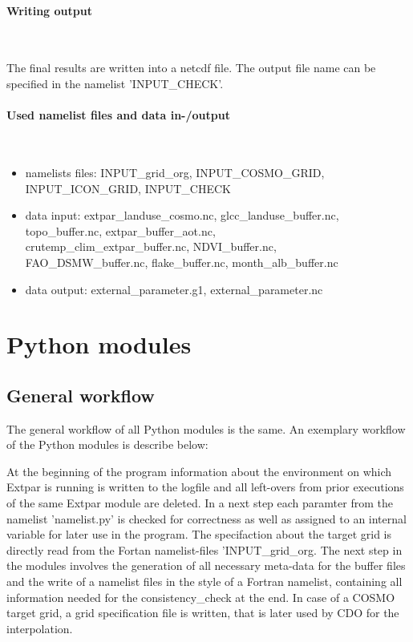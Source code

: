 \documentclass[a4paper,10pt,DIV14,BCOR1cm,titlepage,twoside]{scrartcl}
\begin{document}
\paragraph{Writing output}\ \par\medskip\noindent
The final results are written into a netcdf file. The output file name can be specified in the namelist 'INPUT\_CHECK'.\par\medskip\noindent
\paragraph{Used namelist files and data in-/output}\ \par\medskip\noindent
\begin{itemize}
 \item namelists files: INPUT\_grid\_org, INPUT\_COSMO\_GRID, INPUT\_ICON\_GRID, INPUT\_CHECK
 \item data input: extpar\_landuse\_cosmo.nc, glcc\_landuse\_buffer.nc, \\ 
   topo\_buffer.nc, extpar\_buf\-fer\_aot.nc, \\ 
   crutemp\_clim\_extpar\_buffer.nc, NDVI\_buffer.nc, \\ 
   FAO\_DSMW\_buffer.nc, flake\_buffer.nc, month\_alb\_buffer.nc
 \item data output: external\_parameter.g1, external\_parameter.nc
\end{itemize}

\clearpage

\section{Python modules}\label{Python modules}

\subsection{General workflow}\label{General workflow}
The general workflow of all Python modules is the same. An exemplary workflow of the Python modules is describe below:

\noindent At the beginning of the program information about the environment on which Extpar is running is written to the logfile and all left-overs from prior executions of the same Extpar module are deleted. In a next step each paramter from the namelist 'namelist.py' is checked for correctness as well as assigned to an internal variable for later use in the program. The specifaction about the target grid is directly read from the Fortan namelist-files 'INPUT\_grid\_org. The next step in the modules involves the generation of all necessary meta-data for the buffer files and the write of a namelist files in the style of a Fortran namelist, containing all information needed for the consistency\_check at the end. In case of a COSMO target grid, a grid specification file is written, that is later used by CDO for the interpolation. 
\end{document}
